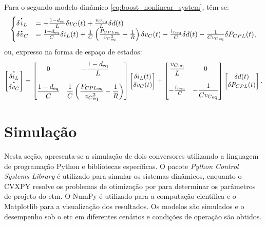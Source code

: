 Para o segundo modelo dinâmico \eqref{eq:boost_nonlinear_system}, têm-se: \begin{equation} \begin{cases} \delta \dt{i}_L &= - \frac{1 - d_{\text{eq}}}{L} \delta v_C(t) + \frac{{v_C}_{\text{eq}}}{L}\delta d(t) \\ \delta \dt{v}_C &= \frac{1 - d_{\text{eq}}}{C} \delta i_L(t) + \frac{1}{C} \left(\frac{{P_{CPL}}_{\text{eq}}}{{v_C}^2_{\text{eq}}} - \frac{1}{R}\right) \delta v_C(t) - \frac{{i_L}_{\text{eq}}}{C} \delta d(t) - \frac{1}{C{v_C}_{\text{eq}}} \delta P_{CPL}(t), \end{cases} \end{equation} ou, expresso na forma de espaço de estados: \begin{equation} \begin{bmatrix} \dt{\delta i_L} \\ \dt{\delta v_C} \end{bmatrix} = \begin{bmatrix} \displaystyle 0 & \displaystyle -\frac{1 - d_{\text{eq}}}{L}  \\\\ \displaystyle \frac{1 - d_{\text{eq}}}{C} & \displaystyle \frac{1}{C}\left(\frac{{P_{CPL}}_{\text{eq}}}{{{v_{C}}^2_{\text{eq}}}} - \frac{1}{R}\right) \end{bmatrix} \begin{bmatrix} \delta i_L(t) \\ \delta v_C(t) \end{bmatrix} + \begin{bmatrix} {\displaystyle \frac{{v_C}_{\text{eq}}}{L}} & 0 \\ \\ - \frac{{i_L}_{\text{eq}}}{C} & \displaystyle {-\frac{1}{C{v_C}_{\text{eq}}}} \end{bmatrix}  \begin{bmatrix} \delta d(t) \\ \delta P_{CPL}(t) \end{bmatrix}. \label{eq:boost_linear_system}\end{equation}

\section{Simulação}

Nesta seção, apresenta-se a simulação de dois conversores utilizando a linguagem de programação Python e bibliotecas específicas. O pacote \textit{Python Control Systems Library} é utilizado para simular os sistemas dinâmicos, enquanto o CVXPY resolve os problemas de otimização por  para determinar os parâmetros de projeto do \acrshort{etm}. O NumPy é utilizado para a computação científica e o Matplotlib para a visualização dos resultados. Os modelos são simulados e o desempenho sob o \acrshort{etc} em diferentes cenários e condições de operação são obtidos.

